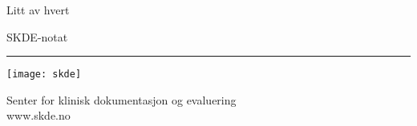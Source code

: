 \begin{titlepage}


\vspace*{1cm}

\noindent
{\textcolor{skde}{\titlefont \printtitle{}}}\par

\vspace*{0.5cm}
{\subtitlefont Litt av hvert}

\vspace*{1cm}
\epigraph{\sammendrag}{SKDE-notat \notatnummer}
\null\vfill
\vspace*{1cm}
\noindent
\hfill
\begin{minipage}{0.39\linewidth}
    \begin{flushright}
        \printauthor
    \end{flushright}
\end{minipage}
%
\begin{minipage}{0.02\linewidth}
\null
\end{minipage}
\begin{minipage}{0.02\linewidth}
    \rule{1pt}{\hoydestrek}
\end{minipage}
\titlepagedecoration


\hfill

\begin{minipage}{2in}
\texttt{[image: skde]}
\end{minipage}
\hfill
\begin{minipage}{3in}
\begin{flushright}
\textcolor{skde}{
Senter for klinisk dokumentasjon og evaluering\\
www.skde.no
}
\end{flushright}
\end{minipage}


\end{titlepage}

